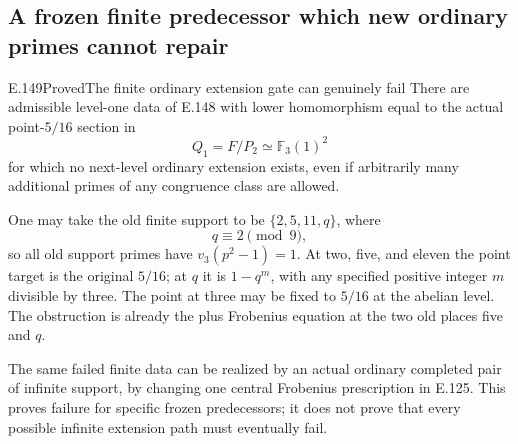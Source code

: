 \subsection{A frozen finite predecessor which new ordinary primes cannot repair}

\begin{result}{E.149}{Proved}{The finite ordinary extension gate can genuinely fail}
There are admissible level-one data of E.148
with lower homomorphism equal to the actual
point-\(5/16\) section in
\[
                 Q_1=F/P_2\simeq\mathbb F_3(1)^2
\]
for which no next-level ordinary extension
exists, even if arbitrarily many additional
primes of any congruence class are allowed.

One may take the old finite support to be
\(\{2,5,11,q\}\), where
\[
                    q\equiv2\pmod9,
\]
so all old support primes have
\(v_3(p^2-1)=1\).
At two, five, and eleven the point target
is the original \(5/16\); at \(q\) it is
\(1-q^m\), with any specified positive
integer \(m\) divisible by three.
The point at three may be fixed to \(5/16\)
at the abelian level.
The obstruction is already the plus
Frobenius equation at the two old places
five and \(q\).

The same failed finite data can be
realized by an actual ordinary completed
pair of infinite support, by changing
one central Frobenius prescription in
E.125. This proves failure for specific
frozen predecessors; it does not prove
that every possible infinite extension
path must eventually fail.
\end{result}
